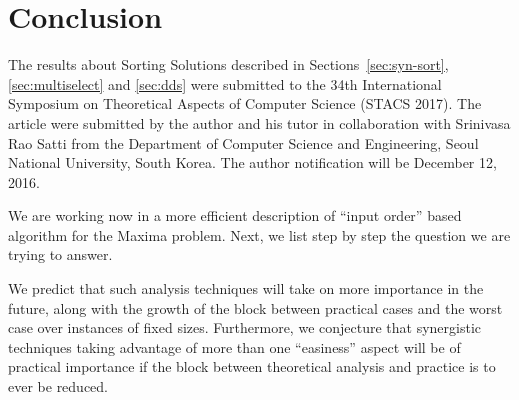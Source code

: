 \section{Conclusion}
\label{sec:con}


The results about Sorting Solutions described in
Sections~\ref{sec:syn-sort}, \ref{sec:multiselect} and \ref{sec:dds}
were submitted to the 34th International Symposium on Theoretical
Aspects of Computer Science (STACS 2017). The article were submitted
by the author and his tutor in collaboration with Srinivasa Rao Satti
from the Department of Computer Science and Engineering, Seoul
National University, South Korea. The author notification will be
December 12, 2016.



We are working now in a more efficient description of ``input order''
based algorithm for the Maxima problem. Next, we list step by step the
question we are trying to answer.



We predict that such analysis techniques will take on more importance
in the future, along with the growth of the block between practical
cases and the worst case over instances of fixed sizes. Furthermore,
we conjecture that synergistic techniques taking advantage of more
than one ``easiness'' aspect will be of practical importance if the
block between theoretical analysis and practice is to ever be reduced.

